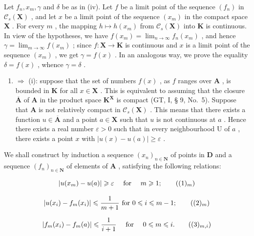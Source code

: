 Let \(f_n, x_m, \gamma\) and \(\delta\) be as in (iv). Let \(f\) be a limit point of the sequence \((f_n)\) in \(\mathcal{C}_s(\mathbf{X})\) , and let \(x\) be a limit point of the sequence \((x_m)\) in the compact space \(\mathbf{X}\) . For every \(m\) , the mapping \(h \mapsto h(x_m)\) from \(\mathcal{C}_s(\mathbf{X})\) into \(\mathbf{K}\) is continuous. In view of the hypotheses, we have \(f(x_m) = \lim_{n \to \infty} f_n(x_m)\) , and hence \(\gamma = \lim_{m \to \infty} f(x_m)\) ; since \(f: \mathbf{X} \to \mathbf{K}\) is continuous and \(x\) is a limit point of the sequence \((x_m)\) , we get \(\gamma = f(x)\) . In an analogous way, we prove the equality \(\delta = f(x)\) , whence \(\gamma = \delta\) .

\begin{enumerate}
\def\labelenumi{(\roman{enumi})}
\setcounter{enumi}{3}
\tightlist
\item
  \(\Rightarrow\) (i): suppose that the set of numbers \(f(x)\) , as \(f\) ranges over \(\mathbf{A}\) , is bounded in \(\mathbf{K}\) for all \(x\in \mathbf{X}\) . This is equivalent to assuming that the closure \(\overline{\mathbf{A}}\) of \(\mathbf{A}\) in the product space \(\mathbf{K}^{\mathbf{X}}\) is compact (GT, I, § 9, No.~5). Suppose that \(\mathbf{A}\) is not relatively compact in \(\mathcal{C}_s(\mathbf{X})\) . This means that there exists a function \(u\in \overline{\mathbf{A}}\) and a point \(a\in \mathbf{X}\) such that \(u\) is not continuous at \(a\) . Hence there exists a real number \(\varepsilon >0\) such that in every neighbourhood \(\mathrm{U}\) of \(a\) , there exists a point \(x\) with \(|u(x) - u(a)|\geqslant \varepsilon\) .
\end{enumerate}

We shall construct by induction a sequence \((x_{n})_{n\in \mathbf{N}}\) of points in \(\mathbf{D}\) and a sequence \((f_n)_{n\in \mathbf{N}}\) of elements of \(\mathbf{A}\) , satisfying the following relations:

\[
\left| u (x _ {m}) - u (a) \right| \geqslant \varepsilon \quad \text { for } \quad m \geqslant 1;\tag{$(1)_{m}$}
\]

\[
\left| u (x _ {i}) - f _ {m} (x _ {i}) \right| \leqslant \frac {1}{m + 1} \text { for } 0 \leqslant i \leqslant m - 1;\tag{$(2)_{m}$}
\]

\[
\left| f _ {m} (x _ {i}) - f _ {m} (a) \right| \leqslant \frac {1}{i + 1} \quad \text { for } \quad 0 \leqslant m \leqslant i.\tag{$(3)_{m,i}$}
\]

